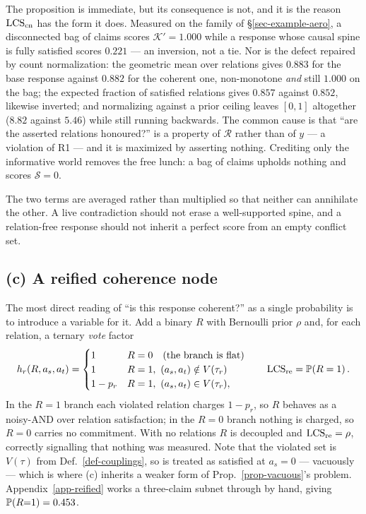 The proposition is immediate, but its consequence is not, and it is the reason
$\mathrm{LCS}_{\mathrm{cn}}$ has the form it does. Measured on the family of \S\ref{sec-example-aero}, a disconnected
bag of claims scores $\mathcal{K}'=1.000$ while a response whose causal spine is fully satisfied
scores $0.221$ --- an inversion, not a tie. Nor is the defect repaired by count normalization: the
geometric mean over relations gives $0.883$ for the base response against $0.882$ for the coherent
one, non-monotone \emph{and} still $1.000$ on the bag; the expected fraction of satisfied relations
gives $0.857$ against $0.852$, likewise inverted; and normalizing against a prior ceiling leaves
$[0,1]$ altogether ($8.82$ against $5.46$) while still running backwards. The common cause is that
``are the asserted relations honoured?'' is a property of $\mathcal{R}$ rather than of $y$ --- a
violation of R1 --- and it is maximized by asserting nothing. Crediting only the informative world
removes the free lunch: a bag of claims upholds nothing and scores $\mathcal{S}=0$.

The two terms are averaged rather than multiplied so that neither can annihilate the other. A live
contradiction should not erase a well-supported spine, and a relation-free response should not
inherit a perfect score from an empty conflict set.

\subsection{(c) A reified coherence node}
\label{sec-reified}

The most direct reading of ``is this response coherent?'' as a single probability is to introduce a
variable for it. Add a binary $R$ with Bernoulli prior $\rho$ and, for each relation, a ternary
\emph{vote} factor
\begin{equation}
h_r(R,a_s,a_t)=\begin{cases}
1 & R=0 \quad\text{(the branch is flat)}\\
1 & R=1,\ (a_s,a_t)\notin V(\tau_r)\\
1-p_r & R=1,\ (a_s,a_t)\in V(\tau_r),
\end{cases}
\qquad \mathrm{LCS}_{\mathrm{re}}=\mathbb{P}\!\left( R=1 \right).
\label{eq-reified}
\end{equation}
In the $R=1$ branch each violated relation charges $1-p_r$, so $R$ behaves as a noisy-AND over
relation satisfaction; in the $R=0$ branch nothing is charged, so $R=0$ carries no commitment. With
no relations $R$ is decoupled and $\mathrm{LCS}_{\mathrm{re}}=\rho$, correctly signalling that nothing was measured.
Note that the violated set is $V(\tau)$ from Def.~\ref{def-couplings}, so \ent{} is treated as
satisfied at $a_s=0$ --- vacuously --- which is where (c) inherits a weaker form of
Prop.~\ref{prop-vacuous}'s problem. Appendix~\ref{app-reified} works a three-claim subnet through by
hand, giving $\mathbb{P}\!\left( R{=}1 \right)=0.453$.

